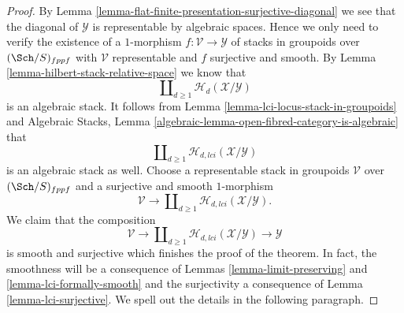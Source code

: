 \begin{proof}
By
Lemma \ref{lemma-flat-finite-presentation-surjective-diagonal}
we see that the diagonal of $\mathcal{Y}$ is representable by algebraic
spaces. Hence we only need to verify the existence of a $1$-morphism
$f : \mathcal{V} \to \mathcal{Y}$ of stacks in groupoids over
$(\Sch/S)_{fppf}$ with $\mathcal{V}$ representable and
$f$ surjective and smooth. By
Lemma \ref{lemma-hilbert-stack-relative-space}
we know that
$$
\coprod\nolimits_{d \geq 1} \mathcal{H}_d(\mathcal{X}/\mathcal{Y})
$$
is an algebraic stack. It follows from
Lemma \ref{lemma-lci-locus-stack-in-groupoids}
and
Algebraic Stacks,
Lemma \ref{algebraic-lemma-open-fibred-category-is-algebraic}
that
$$
\coprod\nolimits_{d \geq 1} \mathcal{H}_{d, lci}(\mathcal{X}/\mathcal{Y})
$$
is an algebraic stack as well. Choose a representable stack in groupoids
$\mathcal{V}$ over $(\Sch/S)_{fppf}$ and a surjective and smooth
$1$-morphism
$$
\mathcal{V}
\longrightarrow
\coprod\nolimits_{d \geq 1} \mathcal{H}_{d, lci}(\mathcal{X}/\mathcal{Y}).
$$
We claim that the composition
$$
\mathcal{V}
\longrightarrow
\coprod\nolimits_{d \geq 1} \mathcal{H}_{d, lci}(\mathcal{X}/\mathcal{Y})
\longrightarrow
\mathcal{Y}
$$
is smooth and surjective which finishes the proof of the theorem. In fact,
the smoothness will be a consequence of
Lemmas \ref{lemma-limit-preserving} and \ref{lemma-lci-formally-smooth}
and the surjectivity a consequence of
Lemma \ref{lemma-lci-surjective}.
We spell out the details in the following paragraph.


\end{proof}
